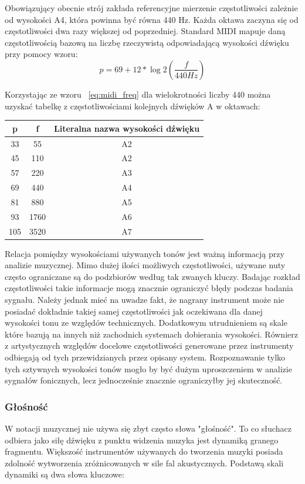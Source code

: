 \documentclass[12pt,a4paper,twoside]{mwart}
\begin{document}
Obowiązujący obecnie strój zakłada referencyjne mierzenie częstotliwości zależnie od wysokości A4, która powinna być równa 440 Hz. Każda oktawa zaczyna się od częstotliwości dwa razy większej od poprzedniej. Standard MIDI mapuje daną częstotliwością bazową na liczbę rzeczywistą odpowiadającą wysokości dźwięku przy pomocy wzoru:
\begin{equation} \label{eq:midi_freq}
p = 69 + 12 * \log{2}(\frac{f}{440 Hz})
\end{equation}

Korzystając ze wzoru ~\ref{eq:midi_freq} dla wielokrotności liczby 440 można uzyskać tabelkę z częstotliwościami kolejnych dźwięków A w oktawach:

\begin{center}
  \begin{tabular}{ |c|c|c| } 
   \hline
   p & f & Literalna nazwa wysokości dźwięku\\
   \hline
   33 & 55 & A2\\
   45 & 110 & A2\\
   57 & 220 & A3\\
   69 & 440 & A4\\
   81 & 880 & A5\\
   93 & 1760 & A6\\
   105 & 3520 & A7\\
   \hline
  \end{tabular}
\end{center}

Relacja pomiędzy wysokościami używanych tonów jest ważną informacją przy analizie muzycznej. Mimo dużej ilości możliwych częstotliwości, używane nuty często ograniczane są do podzbiorów według tak zwanych kluczy. Badając rozkład częstotliwości takie informacje mogą znacznie ograniczyć błędy podczas badania sygnału. Należy jednak mieć na uwadze fakt, że nagrany instrument może nie posiadać dokładnie takiej samej częstotliwości jak oczekiwana dla danej wysokości tonu ze względów technicznych. Dodatkowym utrudnieniem są skale które bazują na innych niż zachodnich systemach dobierania wysokości. Równierz z artystycznych względów docelowe częstotliwości generowane przez instrumenty odbiegają od tych przewidzianych przez opisany system. Rozpoznawanie tylko tych sztywnych wysokości tonów mogło by być dużym uproszczeniem w analizie sygnałów fonicznych, lecz jednocześnie znacznie ograniczyłby jej skuteczność.

\subsubsection{Głośność}
W notacji muzycznej nie używa się zbyt często słowa "głośność". To co słuchacz odbiera jako siłę dźwięku z punktu widzenia muzyka jest dynamiką granego fragmentu. Większość instrumentów używanych do tworzenia muzyki posiada zdolność wytworzenia zróżnicowanych w sile fal akustycznych. Podstawą skali dynamiki są dwa słowa kluczowe:
\end{document}
